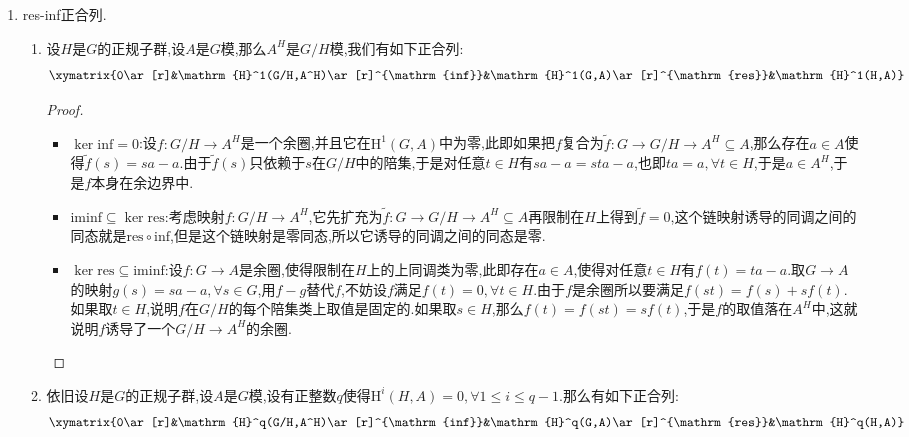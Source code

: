 \begin{enumerate}
\begin{proof}
		取$H$模$A'$的内射预解$I^*\to A'$,那么$\mathrm{H}^q(H,A')$就是对简化内射预解$I^*\to0$作用函子$M\mapsto M^H$再取同调.但是对任意$H$模$M$,我们有$(\mathrm{coInd}_H^G(M))^G=M^H$,于是$\mathrm{H}^q(H,A')$也就是对$\mathrm{coInd}(I)^*\to0$作用函子$M\to M^G$再取同调.由于$\mathbb{Z}[G]$是$\mathbb{Z}[H]$范畴上的自由模,于是$\mathrm{coInd}_H^G(-)$是$\textbf{H-Mod}\to\textbf{G-Mod}$的正合函子,并且它把内射对象映射为内射对象,于是$\mathrm{coInd}(I)^*\to A$也是$G$模范畴上$A$的内射预解,它作用函子$M\to M^G$再取同调就是$\mathrm{H}^q(G,A)$.
	\end{proof}
	\item res-inf正合列.
	\begin{enumerate}
		\item 设$H$是$G$的正规子群,设$A$是$G$模,那么$A^H$是$G/H$模,我们有如下正合列:
		$$\xymatrix{0\ar[r]&\mathrm{H}^1(G/H,A^H)\ar[r]^{\mathrm{inf}}&\mathrm{H}^1(G,A)\ar[r]^{\mathrm{res}}&\mathrm{H}^1(H,A)}$$
		\begin{proof}
			\begin{itemize}
				\item $\ker\mathrm{inf}=0$:设$f:G/H\to A^H$是一个余圈,并且它在$\mathrm{H}^1(G,A)$中为零,此即如果把$f$复合为$\widetilde{f}:G\to G/H\to A^H\subseteq A$,那么存在$a\in A$使得$\widetilde{f}(s)=sa-a$.由于$\widetilde{f}(s)$只依赖于$s$在$G/H$中的陪集,于是对任意$t\in H$有$sa-a=sta-a$,也即$ta=a,\forall t\in H$,于是$a\in A^H$,于是$f$本身在余边界中.
				\item $\mathrm{im}\mathrm{inf}\subseteq\ker\mathrm{res}$:考虑映射$f:G/H\to A^H$,它先扩充为$\widetilde{f}:G\to G/H\to A^H\subseteq A$再限制在$H$上得到$\widetilde{f}=0$,这个链映射诱导的同调之间的同态就是$\mathrm{res}\circ\mathrm{inf}$,但是这个链映射是零同态,所以它诱导的同调之间的同态是零.
				\item $\ker\mathrm{res}\subseteq\mathrm{im}\mathrm{inf}$:设$f:G\to A$是余圈,使得限制在$H$上的上同调类为零,此即存在$a\in A$,使得对任意$t\in H$有$f(t)=ta-a$.取$G\to A$的映射$g(s)=sa-a,\forall s\in G$,用$f-g$替代$f$,不妨设$f$满足$f(t)=0,\forall t\in H$.由于$f$是余圈所以要满足$f(st)=f(s)+sf(t)$.如果取$t\in H$,说明$f$在$G/H$的每个陪集类上取值是固定的.如果取$s\in H$,那么$f(t)=f(st)=sf(t)$,于是$f$的取值落在$A^H$中,这就说明$f$诱导了一个$G/H\to A^H$的余圈.
			\end{itemize}
		\end{proof}
		\item 依旧设$H$是$G$的正规子群,设$A$是$G$模,设有正整数$q$使得$\mathrm{H}^i(H,A)=0,\forall 1\le i\le q-1$.那么有如下正合列:
		$$\xymatrix{0\ar[r]&\mathrm{H}^q(G/H,A^H)\ar[r]^{\mathrm{inf}}&\mathrm{H}^q(G,A)\ar[r]^{\mathrm{res}}&\mathrm{H}^q(H,A)}$$
		

\end{enumerate}
\end{enumerate}
